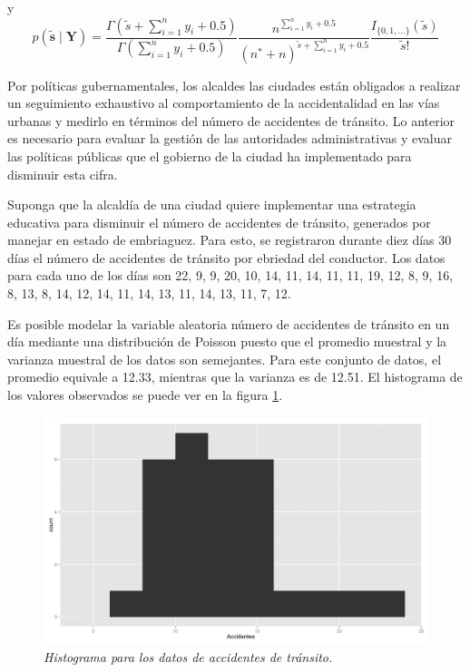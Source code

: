 \documentclass[10pt,openright]{book}\usepackage[]{graphicx}\usepackage[]{color}
\begin{document}
    y
    \begin{equation}\label{pred1_posson_Jeffreys}
    p(\tilde{\mathbf{s}} \mid \mathbf{Y})=\frac{\Gamma(\tilde{s}+\sum_{i=1}^ny_i+0.5)}{\Gamma(\sum_{i=1}^ny_i+0.5)}
    \frac{n^{\sum_{i=1}^ny_i+0.5}}{({n^*}+n)^{\tilde{s}+\sum_{i=1}^ny_i+0.5}}\frac{I_{\{0,1,\ldots\}}(\tilde{s})}{\tilde{s}!}
    \end{equation}
    
    \begin{Eje}\label{Datos_Poisson}
    Por pol\'iticas gubernamentales, los alcaldes las ciudades est\'an obligados a realizar un seguimiento exhaustivo al comportamiento de la accidentalidad en las v\'ias urbanas y medirlo en t\'erminos del n\'umero de accidentes de tr\'ansito. Lo anterior es necesario para evaluar la gesti\'on de las autoridades administrativas y evaluar las pol\'iticas p\'ublicas que el gobierno de la ciudad ha implementado para disminuir esta cifra.
    
    Suponga que la alcald\'ia de una ciudad quiere implementar una estrategia educativa para disminuir el n\'umero de accidentes de tr\'ansito, generados por manejar en estado de embriaguez. Para esto, se registraron durante diez d\'ias 30 d\'ias el n\'umero de accidentes de tr\'ansito por ebriedad del conductor. Los datos para cada uno de los d\'ias son 22, 9, 9, 20, 10, 14, 11, 14, 11, 11, 19, 12, 8, 9, 16, 8, 13, 8, 14, 12, 14, 11, 14, 13, 11, 14, 13, 11, 7, 12.
    
    Es posible modelar la variable aleatoria n\'umero de accidentes de tr\'ansito en un d\'ia mediante una distribuci\'on de Poisson puesto que el promedio muestral y la varianza muestral de los datos son semejantes. Para este conjunto de datos, el promedio equivale a 12.33, mientras que la varianza es de 12.51. El histograma de los valores observados se puede ver en la figura \ref{EjemPoisson1}.
    
    \begin{figure}[!h]
    \centering
    \includegraphics[scale=0.5]{EjemPoisson1.pdf}
    \caption{\emph{Histograma para los datos de accidentes de tr\'ansito.}}
    \label{EjemPoisson1}
    \end{figure}
    

\end{Eje}
\end{document}
